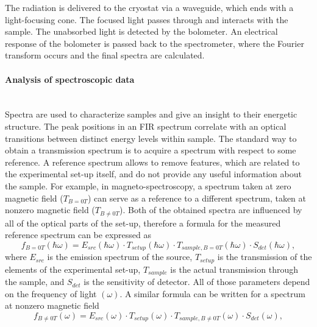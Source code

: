 \documentclass[titlepage,a4paper]{book}
\newcommand{\wciecie}{\quad\phantom{v}}
\newcommand{\myparagraph}[1]{\paragraph{#1}\mbox{}\\}
\begin{document}
The radiation is delivered to the cryostat via a waveguide, which ends with a light-focusing cone. The focused light passes through and interacts with the sample. The unabsorbed light is detected by the bolometer. An electrical response of the bolometer is passed back to the spectrometer, where the Fourier transform occurs and the final spectra are calculated.

\myparagraph{Analysis of spectroscopic data}
\wciecie
Spectra are used to characterize samples and give an insight to their energetic structure. The peak positions in an FIR spectrum correlate with an optical transitions between distinct energy levels within sample. The standard way to obtain a transmission spectrum is to acquire a spectrum with respect to some reference. A reference spectrum allows to remove features, which are related to the experimental set-up itself, and do not provide any useful information about the sample. For example, in magneto-spectroscopy, a spectrum taken at zero magnetic field ($T_{B=0T}$) can serve as a reference to a different spectrum, taken at nonzero magnetic field ($T_{B\neq 0T}$). Both of the obtained spectra are influenced by all of the optical parts of the set-up, therefore a formula for the measured reference spectrum can be expressed as 
\begin{equation}
\label{eq:Spectra1}
f_{B=0T}(\hbar\omega) = E_{src}(\hbar\omega)\cdot T_{setup}(\hbar\omega)\cdot T_{sample,B=0T}(\hbar\omega)\cdot S_{det}(\hbar\omega),
\end{equation}
where $E_{src}$ is the emission spectrum of the source, $T_{setup}$ is the transmission of the elements of the experimental set-up, $T_{sample}$ is the actual transmission through the sample, and $S_{det}$ is the sensitivity of detector. All of those parameters depend on the frequency of light $(\omega)$. A similar formula can be written for a spectrum at nonzero magnetic field
\begin{equation}
\label{eq:Spectra2}
f_{B\neq 0T}(\omega) = E_{src}(\omega)\cdot T_{setup}(\omega)\cdot T_{sample,B\neq 0T}(\omega)\cdot S_{det}(\omega),
\end{equation}
\end{document}
